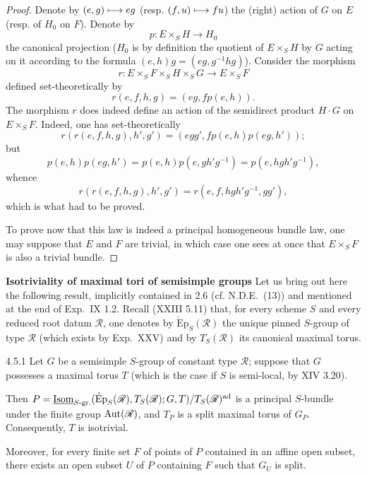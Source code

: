\begin{proof}
Denote by $(e,g)\longmapsto eg$ (resp. $(f,u)\longmapsto fu$) the (right) action of $G$ on $E$ (resp. of $H_0$ on $F$). Denote by
\[
p:E\times_S H\to H_0
\]
the canonical projection ($H_0$ is by definition the quotient of $E\times_S H$ by $G$ acting on it according to the formula $(e,h)g=(eg,g^{-1}hg)$). Consider the morphism
\[
r:E\times_S F\times_S H\times_S G\to E\times_S F
\]
defined set-theoretically by
\[
r(e,f,h,g)=(eg,fp(e,h)).
\]
The morphism $r$ does indeed define an action of the semidirect product $H\cdot G$ on $E\times_S F$. Indeed, one has set-theoretically
\[
r(r(e,f,h,g),h',g')=(egg',fp(e,h)p(eg,h'));
\]
but
\[
p(e,h)p(eg,h')=p(e,h)p(e,gh'g^{-1})=p(e,hgh'g^{-1}),
\]
whence
\[
r(r(e,f,h,g),h',g')=r(e,f,hgh'g^{-1},gg'),
\]
which is what had to be proved.

To prove now that this law is indeed a principal homogeneous bundle law, one may suppose that $E$ and $F$ are trivial, in which case one sees at once that $E\times_S F$ is also a trivial bundle.
\end{proof}
\label{XXIV.4.5}\textbf{Isotriviality of maximal tori of semisimple groups}
Let us bring out here the following result, implicitly contained in 2.6 (cf. N.D.E.~(13)) and mentioned at the end of Exp.~IX 1.2. Recall (XXIII 5.11) that, for every scheme $S$ and every reduced root datum $\mathscr R$, one denotes by $\operatorname{\acute Ep}_S(\mathscr R)$ the unique pinned $S$-group of type $\mathscr R$ (which exists by Exp.~XXV) and by $T_S(\mathscr R)$ its canonical maximal torus.
\begin{proposition}{4.5.1}\label{XXIV.4.5.1}
Let $G$ be a semisimple $S$-group of constant type $\mathscr R$; suppose that $G$ possesses a maximal torus $T$ (which is the case if $S$ is semi-local, by XIV 3.20).
\begin{enumeratei}
\item Then $P=\underline{\operatorname{Isom}}_{S\text{-gr.}}(\operatorname{\acute Ep}_S(\mathscr R),T_S(\mathscr R);G,T)/T_S(\mathscr R)^{\mathrm{ad}}$ is a principal $S$-bundle under the finite group $\operatorname{Aut}(\mathscr R)$, and $T_P$ is a split maximal torus of $G_P$. Consequently, $T$ is isotrivial.
\item Moreover, for every finite set $F$ of points of $P$ contained in an affine open subset, there exists an open subset $U$ of $P$ containing $F$ such that $G_U$ is split.
\end{enumeratei}
\end{proposition}

